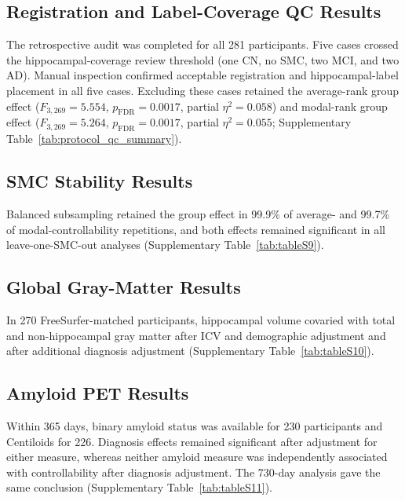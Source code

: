 \documentclass{article}
\providecommand{\DIFaddtex}[1]{{\protect\color{blue}#1}} %
\providecommand{\DIFaddbegin}{} %
\providecommand{\DIFaddend}{} %
\providecommand{\DIFadd}[1]{\texorpdfstring{\DIFaddtex{#1}}{#1}} %
\providecommand{\DIFchgtex}[1]{{\setlength{\fboxsep}{0pt}\colorbox{yellow}{\strut #1}}}
\providecommand{\DIFchg}[1]{\texorpdfstring{\DIFchgtex{#1}\allowbreak}{#1}}
\providecommand{\DIFchgbegin}{}
\providecommand{\DIFchgend}{}
\begin{document}
\begingroup
\color{blue}
\def\DIFchg#1{#1}
\def\DIFadd#1{#1}
\let\DIFchgbegin\relax
\let\DIFchgend\relax
\let\DIFaddbegin\relax
\let\DIFaddend\relax
\DIFchgbegin \subsection{\DIFchg{Registration} \DIFchg{and} \DIFchg{Label-Coverage} \DIFchg{QC} \DIFchg{Results}}
\DIFchg{The} \DIFchg{retrospective} \DIFchg{audit} \DIFchg{was} \DIFchg{completed} \DIFchg{for} \DIFchg{all} \DIFchg{281} \DIFchg{participants.} \DIFchg{Five} \DIFchg{cases} \DIFchg{crossed} \DIFchg{the} \DIFchg{hippocampal-coverage} \DIFchg{review} \DIFchg{threshold} \DIFchg{(one} \DIFchg{CN,} \DIFchg{no} \DIFchg{SMC,} \DIFchg{two} \DIFchg{MCI,} \DIFchg{and} \DIFchg{two} \DIFchg{AD).} \DIFchg{Manual} \DIFchg{inspection} \DIFchg{confirmed} \DIFchg{acceptable} \DIFchg{registration} \DIFchg{and} \DIFchg{hippocampal-label} \DIFchg{placement} \DIFchg{in} \DIFchg{all} \DIFchg{five} \DIFchg{cases.} \DIFchg{Excluding} \DIFchg{these} \DIFchg{cases} \DIFchg{retained} \DIFchg{the} \DIFchg{average-rank} \DIFchg{group} \DIFchg{effect} \DIFchg{(\(F_{3,269}=5.554\),} \DIFchg{\(p_{\mathrm{FDR}}=0.0017\),} \DIFchg{partial} \DIFchg{\(\eta^2=0.058\))} \DIFchg{and} \DIFchg{modal-rank} \DIFchg{group} \DIFchg{effect} \DIFchg{(\(F_{3,269}=5.264\),} \DIFchg{\(p_{\mathrm{FDR}}=0.0017\),} \DIFchg{partial} \DIFchg{\(\eta^2=0.055\);} \DIFchg{Supplementary} \DIFchg{Table~\ref{tab:protocol_qc_summary}).}


\endgroup
\DIFaddend \subsection{SMC Stability Results}
Balanced subsampling retained the group effect in 99.9\% of average- and 99.7\% of modal-controllability repetitions, and both effects remained significant in all leave-one-SMC-out analyses (Supplementary Table~\ref{tab:tableS9}).

\subsection{Global Gray-Matter Results}
In 270 FreeSurfer-matched participants, hippocampal volume covaried with total and non-hippocampal gray matter after ICV and demographic adjustment and after additional diagnosis adjustment (Supplementary Table~\ref{tab:tableS10}).

\subsection{Amyloid PET Results}
Within 365 days, binary amyloid status was available for 230 participants and Centiloids for 226. Diagnosis effects remained significant after adjustment for either measure, whereas neither amyloid measure was independently associated with controllability after diagnosis adjustment. The 730-day analysis gave the same conclusion (Supplementary Table~\ref{tab:tableS11}).
\end{document}
